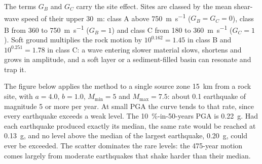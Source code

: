 The terms $G_B$ and $G_C$ carry the site effect. Sites are classed by the mean shear-wave
speed of their upper \qty{30}{m}: class A above \qty{750}{m.s^{-1}} ($G_B = G_C = 0$), class B from
360 to \qty{750}{m.s^{-1}} ($G_B = 1$) and class C from 180 to \qty{360}{m.s^{-1}} ($G_C = 1$). Soft
ground multiplies the rock motion by $10^{0.162} = 1.45$ in class B and $10^{0.251} = 1.78$ in class
C: a wave entering slower material slows, shortens and grows in amplitude, and a soft layer or a
sediment-filled basin can resonate and trap it.

The figure below applies the method to a single source zone \qty{15}{km} from a rock site, with $a
= 4.0$, $b = 1.0$, $M_{\min} = 5$ and $M_{\max} = 7.5$: about 0.1 earthquake of magnitude 5 or
more per year. At small PGA the curve tends to that rate, since every earthquake exceeds a weak
level. The \qty{10}{\percent}-in-50-years PGA is \qty{0.22}{g}. Had each earthquake produced
exactly its median, the same rate would be reached at \qty{0.13}{g}, and no level above the median
of the largest earthquake, \qty{0.20}{g}, could ever be exceeded. The scatter dominates the rare
levels: the 475-year motion comes largely from moderate earthquakes that shake harder than their
median.

